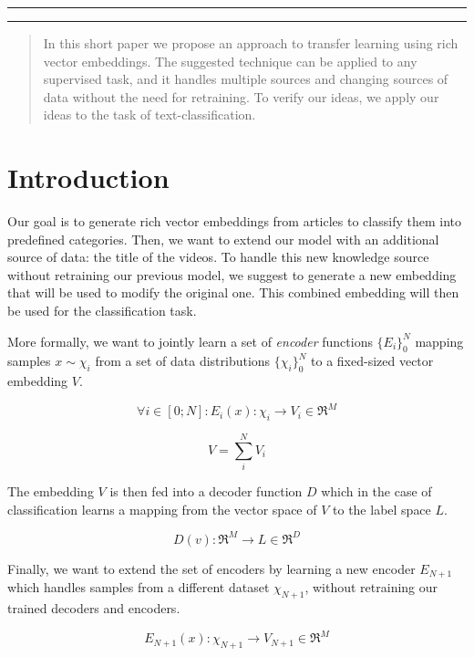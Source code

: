 \documentclass[12pt]{article}
\makeatletter
\def\maketitle{
    \begin{centering}
    \par\rule{\textwidth}{2pt}
    \par\hfill
    \par\textbf{\LARGE\@title}
    \par\hfill
    \par{\textit{\@author}}
    \par\hfill
    \par{\@date}
    \par\rule{\textwidth}{2pt}
    \end{centering}
}
\makeatother
\begin{document}
\thispagestyle{empty}
\maketitle
\hfill
\begin{abstract}
In this short paper we propose an approach to transfer learning using rich
vector embeddings. The suggested technique can be applied to any supervised
task, and it handles multiple sources and changing sources of data without the
need for retraining. To verify our ideas, we apply our ideas to the task of
text-classification.
\end{abstract}

\section{Introduction}\label{introduction}

Our goal is to generate rich vector embeddings from articles to classify
them into predefined categories. Then, we want to extend our model with
an additional source of data: the title of the videos. To handle this
new knowledge source without retraining our previous model, we suggest
to generate a new embedding that will be used to modify the original
one. This combined embedding will then be used for the classification
task.

More formally, we want to jointly learn a set of \emph{encoder}
functions $\{E_i\}_0^N$ mapping samples $x \sim \chi_i$ from a set of
data distributions $\{\chi_i\}_0^N$ to a fixed-sized vector embedding
$V$.

\[ \forall i \in [0; N]: E_i(x): \chi_i \rightarrow V_i \in \Re^M\]

\[V = \sum_i^N V_i\]

The embedding $V$ is then fed into a decoder function $D$ which in the
case of classification learns a mapping from the vector space of $V$ to
the label space $L$.

\[ D(v): \Re^M \rightarrow L \in \Re^D\]

Finally, we want to extend the set of encoders by learning a new encoder
$E_{N+1}$ which handles samples from a different dataset $\chi_{N+1}$,
without retraining our trained decoders and encoders.

\[ E_{N+1}(x): \chi_{N+1} \rightarrow V_{N+1} \in \Re^M\]
\end{document}
